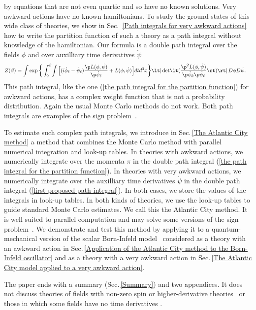 \documentclass[prd,preprint,floatfix,showpacs]{revtex4-1}
\begin{document}
by equations that are not even quartic
and so have no known solutions.
Very awkward actions
have no known hamiltonians.
To study the ground states
of this wide class of theories,
we show in
Sec.~\ref {Path integrals for very awkward actions}
how to write the partition function
of such a theory as a path integral
without knowledge of the hamiltonian.
Our formula is a double path integral
over the fields \( \phi \) and over
auxilliary time derivatives \( \dot \psi \)
\begin{equation}
   \begin{split}
Z(\beta) = {}&
\! \int \exp \bigg\{ \int_0^\beta \! \int 
\Big[ ( i \dot \phi_\ell
- \dot \psi_\ell ) \frac{ \p  L(\phi, \dot \psi) }
{ \p \dot \psi_\ell }
+ L(\phi, \dot \psi) 
\Big] dt d^3x \bigg\}  \lt| \det \! 
\lt( \frac{ \p^2  L(\phi, \dot \psi) }
{ \p \dot \psi_k \p \dot \psi_\ell }  \rt) \rt|
\, D\phi D\dot\psi .
\label {first proposed path integral}
   \end{split}
\end{equation}
This path integral, like the one 
(\ref {the path integral for the partition function})
for awkward actions,
has a complex weight function
that is not a probability distribution.
Again the usual Monte Carlo methods
do not work.  
Both path integrals are examples
of the sign problem~\cite{Behtash:2015loa, *Scorzato:2015qts, *Gattringer:2016kco}.
\par
To estimate such complex path integrals,
we introduce in 
Sec.\,\ref{The Atlantic City method}
a method that combines the 
Monte Carlo method with parallel numerical integration
and look-up tables.
In theories with awkward actions,
we numerically integrate over the momenta
\( \pi \) in the double path integral 
(\ref {the path integral for the partition function})\@.
In theories with very awkward actions,
we numerically integrate over the auxilliary
time derivatives \( \dot \psi \) in the double path integral 
(\ref {first proposed path integral})\@.
In both cases, we store the values of the integrals
in look-up tables.
In both kinds of theories,
we use the look-up tables
to guide standard Monte Carlo estimates.
We call this the Atlantic City method.
It is well suited to
parallel computation and may solve
some versions of the sign 
problem~\cite{Behtash:2015loa, *Scorzato:2015qts, *Gattringer:2016kco}.
We demonstrate and test this method
by applying it to a
quantum-mechanical version of the scalar Born-Infeld 
model~\cite{Born:1934gh, *Born:1934dia, *Born:1935ap}
considered as a theory with an awkward action
in
Sec.\,\ref {Application of the Atlantic City method to the Born-Infeld oscillator} and as a theory with a very awkward action in
Sec.\,\ref{The Atlantic City model applied to a very awkward action}\@.
\par
The paper ends with a summary (Sec.\,\ref{Summary})
and two appendices.
It does not discuss theories of fields with non-zero spin
or higher-derivative
theories~\cite{Ostrogradsky1850,*BenderMannheim2007, *
BenderMannheim2008} 
or those in which some 
fields have no time derivatives
\cite{Dirac1950, *Dirac1958, *Dirac1964}\@.
\end{document}
